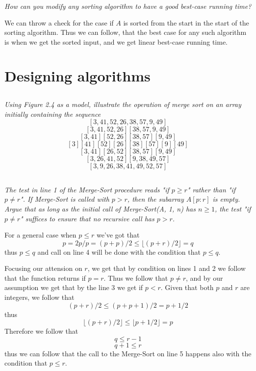 \documentclass[11pt,oneside,titlepage]{book}
\begin{document}
\textit{How can you modify any sorting algorithm to have a good best-case running time?}

We can throw a check for the case if $A$ is sorted from the start in the start of the
sorting algorithm. Thus we can follow, that the best case for any such algorithm is
when we get the sorted input, and we get linear best-case running time.

\section{Designing algorithms}

\subsection{}

\textit{Using Figure 2.4 as a model, illustrate the operation of merge sort on an array
  initially containing the sequence }
$$[3, 41, 52, 26, 38, 57, 9, 49]$$
$$[3, 41, 52, 26] [ 38, 57, 9, 49]$$
$$[3, 41] [52, 26] [38, 57] [9, 49]$$
$$[3] [41] [52] [26] [38] [57] [9] [49]$$
$$[3, 41] [26, 52] [38, 57] [9, 49]$$
$$[3, 26, 41,  52] [9, 38, 49, 57]$$
$$[3, 9, 26, 38, 41, 49, 52, 57]$$

\subsection{}

\textit{The test in line 1 of the Merge-Sort procedure reads "if $p \geq r$" rather than
  "if $p \neq r$". If Merge-Sort is called with $p > r$, then the subarray $A[p:r]$ is
  empty. Argue that as long as the initial call of Merge-Sort(A, 1, n) has $n \geq 1$, the
  test "if $p \neq r$" suffices to ensure that no recursive call has $p > r$.}

For a general case when $p \leq r$ we've got that
$$p = 2p/p = (p + p)/2 \leq \lfloor(p + r)/2\rfloor = q$$
thus $p \leq q$ and call on line 4 will be done with the condition that $p \leq q$.

Focusing our attension on $r$, we get that by condition on lines 1 and 2 we follow that
the function returns if $p = r$. Thus we follow that $p \neq r$, and by our assumption
we get that by the line 3 we get if $p < r$. Given that both  $p$ and $r$ are integers,
we follow that
$$(p + r)/2 \leq (p + p + 1)/2  = p + 1/2$$
thus
$$\lfloor(p + r)/2\rfloor \leq  \lfloor p + 1/2 \rfloor = p$$
Therefore we follow that
$$q \leq r - 1$$
$$q + 1\leq r$$
thus we can follow that the call to the Merge-Sort on line 5 happens also with the condition
that $p \leq r$.
\end{document}
